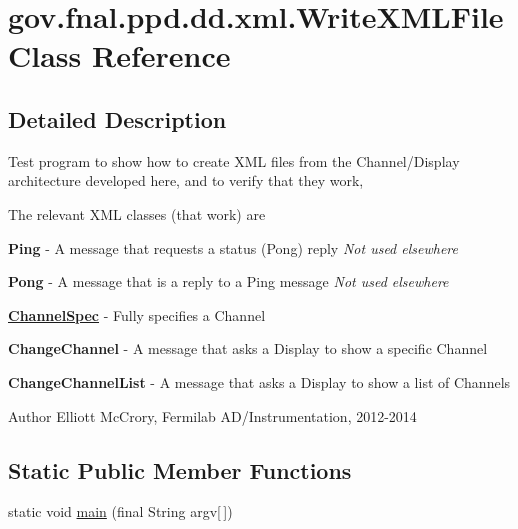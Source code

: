 \hypertarget{classgov_1_1fnal_1_1ppd_1_1dd_1_1xml_1_1WriteXMLFile}{\section{gov.\-fnal.\-ppd.\-dd.\-xml.\-Write\-X\-M\-L\-File Class Reference}
\label{classgov_1_1fnal_1_1ppd_1_1dd_1_1xml_1_1WriteXMLFile}
}


\subsection{Detailed Description}
Test program to show how to create X\-M\-L files from the Channel/\-Display architecture developed here, and to verify that they work, 

The relevant X\-M\-L classes (that work) are 
\begin{DoxyItemize}
\item {\bfseries Ping} -\/ A message that requests a status (Pong) reply {\itshape Not used elsewhere} 
\item {\bfseries Pong} -\/ A message that is a reply to a Ping message {\itshape Not used elsewhere} 
\item {\bfseries \hyperlink{classgov_1_1fnal_1_1ppd_1_1dd_1_1xml_1_1ChannelSpec}{Channel\-Spec}} -\/ Fully specifies a Channel 
\item {\bfseries Change\-Channel} -\/ A message that asks a Display to show a specific Channel 
\item {\bfseries Change\-Channel\-List} -\/ A message that asks a Display to show a list of Channels 
\end{DoxyItemize}

\begin{DoxyAuthor}{Author}
Elliott Mc\-Crory, Fermilab A\-D/\-Instrumentation, 2012-\/2014 
\end{DoxyAuthor}
\subsection*{Static Public Member Functions}
\begin{DoxyCompactItemize}
\item 
static void \hyperlink{classgov_1_1fnal_1_1ppd_1_1dd_1_1xml_1_1WriteXMLFile_a5cc794a07a8e62fec4291fac882ec9ca}{main} (final String argv\mbox{[}$\,$\mbox{]})
\end{DoxyCompactItemize}


